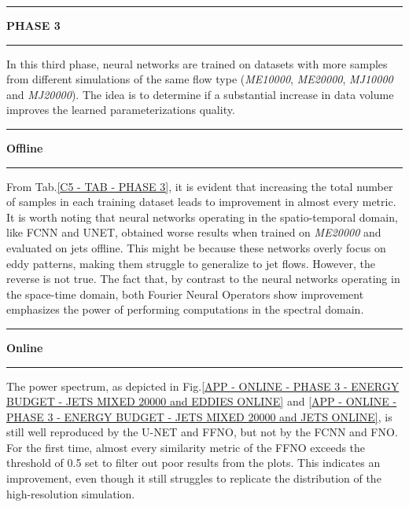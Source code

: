 %
%
\newpage
\rule[0cm]{\linewidth}{0.075cm}
\begin{center}
\Large \textbf{PHASE 3}
\end{center}
\vspace{0.25cm}
\rule[0.3cm]{\linewidth}{0.075cm}


In this third phase, neural networks are trained on datasets with more samples from different simulations of the same flow type (\textit{ME10000}, \textit{ME20000}, \textit{MJ10000} and \textit{MJ20000}). The idea is to determine if a substantial increase in data volume improves the learned parameterizations quality.\\

\rule[0cm]{\linewidth}{0.025cm}
\begin{center}
\small \textbf{Offline}
\end{center}
\rule[0.3cm]{\linewidth}{0.025cm}

From Tab.\ref{C5 - TAB - PHASE 3}, it is evident that increasing the total number of samples in each training dataset leads to improvement in almost every metric. It is worth noting that neural networks operating in the spatio-temporal domain, like FCNN and UNET, obtained worse results when trained on \textit{ME20000} and evaluated on jets offline. This might be because these networks overly focus on eddy patterns, making them struggle to generalize to jet flows. However, the reverse is not true. The fact that, by contrast to the neural networks operating in the space-time domain, both Fourier Neural Operators show improvement emphasizes the power of performing computations in the spectral domain.\\

\rule[0cm]{\linewidth}{0.025cm}
\begin{center}
\small \textbf{Online}
\end{center}
\rule[0.3cm]{\linewidth}{0.025cm}

The power spectrum, as depicted in Fig.\ref{APP - ONLINE - PHASE 3 - ENERGY BUDGET -  JETS MIXED 20000 and EDDIES ONLINE} and \ref{APP - ONLINE - PHASE 3 - ENERGY BUDGET -  JETS MIXED 20000 and JETS ONLINE}, is still well reproduced by the U-NET and FFNO, but not by the FCNN and FNO. For the first time, almost every similarity metric of the FFNO exceeds the threshold of 0.5 set to filter out poor results from the plots. This indicates an improvement, even though it still struggles to replicate the distribution of the high-resolution simulation.\\

